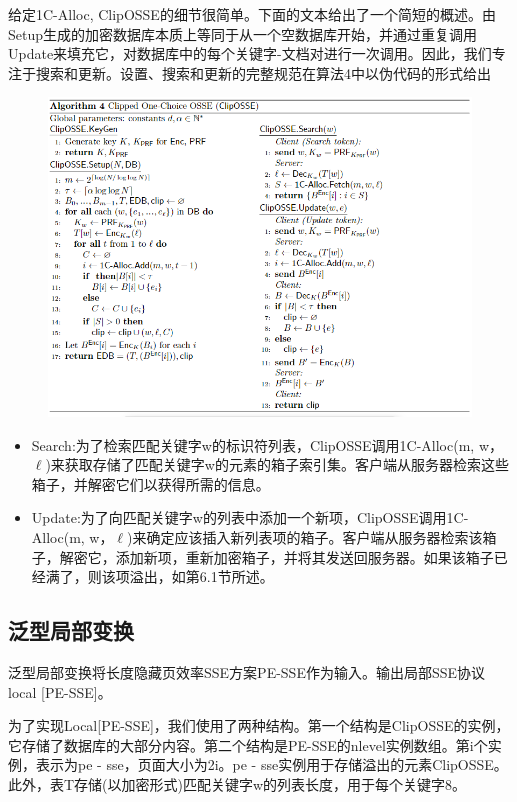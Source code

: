 \documentclass[UTF8]{article}
\begin{document}
给定1C-Alloc, ClipOSSE的细节很简单。下面的文本给出了一个简短的概述。由Setup生成的加密数据库本质上等同于从一个空数据库开始，并通过重复调用Update来填充它，对数据库中的每个关键字-文档对进行一次调用。因此，我们专注于搜索和更新。设置、搜索和更新的完整规范在算法4中以伪代码的形式给出

\begin{figure}[ht]
  \centering
  \includegraphics[scale=0.5]{table6.png}
  \label{table6}
\end{figure}

\begin{itemize}
  \item Search:为了检索匹配关键字w的标识符列表，ClipOSSE调用1C-Alloc(m, w，$\ell$)来获取存储了匹配关键字w的元素的箱子索引集。客户端从服务器检索这些箱子，并解密它们以获得所需的信息。
  \item Update:为了向匹配关键字w的列表中添加一个新项，ClipOSSE调用1C-Alloc(m, w，$\ell$)来确定应该插入新列表项的箱子。客户端从服务器检索该箱子，解密它，添加新项，重新加密箱子，并将其发送回服务器。如果该箱子已经满了，则该项溢出，如第6.1节所述。
\end{itemize}

\subsection{泛型局部变换}
泛型局部变换将长度隐藏页效率SSE方案PE-SSE作为输入。输出局部SSE协议local [PE-SSE]。

为了实现Local[PE-SSE]，我们使用了两种结构。第一个结构是ClipOSSE的实例，它存储了数据库的大部分内容。第二个结构是PE-SSE的nlevel实例数组。第i个实例，表示为pe - sse，页面大小为2i。pe - sse实例用于存储溢出的元素ClipOSSE。此外，表T存储(以加密形式)匹配关键字w的列表长度，用于每个关键字8。
\end{document}
